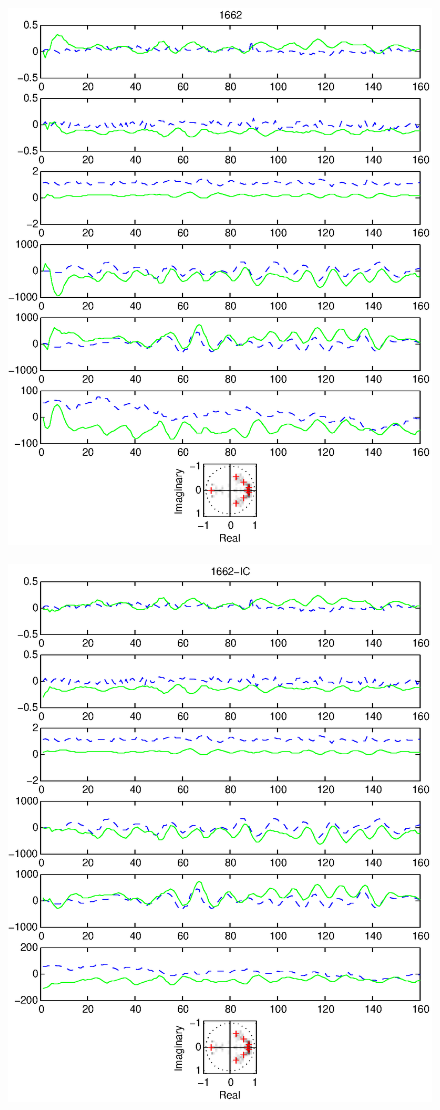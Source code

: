 \documentclass{article}
\begin{document}
\begin{figure}[htb!]
\centering
\includegraphics{1662.eps}
\end{figure}\clearpage
\begin{figure}[htb!]
\centering
\includegraphics{1662_ic.eps}
\end{figure}\clearpage
\end{document}
